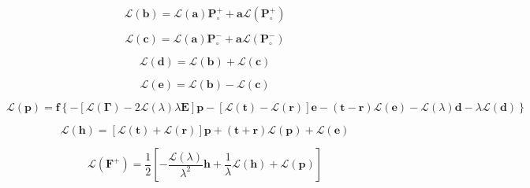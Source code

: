 \begin{equation}
\mathcal{L}(\mathbf{b}) = \mathcal{L}(\mathbf{a})\mathbf{P}^{+}_{\circ} + \mathbf{a}\mathcal{L}(\mathbf{P}^{+}_{\circ})
\label{eq:solar_source-local_solar_source-classical_reduced_order-tangent_linear-b_l}
\end{equation}

\begin{equation}
\mathcal{L}(\mathbf{c}) = \mathcal{L}(\mathbf{a})\mathbf{P}^{-}_{\circ} + \mathbf{a}\mathcal{L}(\mathbf{P}^{-}_{\circ})
\label{eq:solar_source-local_solar_source-classical_reduced_order-tangent_linear-c_l}
\end{equation}

\begin{equation}
\mathcal{L}(\mathbf{d}) = \mathcal{L}(\mathbf{b}) + \mathcal{L}(\mathbf{c})
\label{eq:solar_source-local_solar_source-classical_reduced_order-tangent_linear-d_l}
\end{equation}

\begin{equation}
\mathcal{L}(\mathbf{e}) = \mathcal{L}(\mathbf{b}) - \mathcal{L}(\mathbf{c})
\label{eq:solar_source-local_solar_source-classical_reduced_order-tangent_linear-e_l}
\end{equation}

\begin{equation}
\mathcal{L}(\mathbf{p}) = \mathbf{f}\left\{-\left[\mathcal{L}(\mathbf{\Gamma}) - 2 \mathcal{L}(\lambda)\lambda\mathbf{E}\right]\mathbf{p} - \left[\mathcal{L}(\mathbf{t}) - \mathcal{L}(\mathbf{r})\right]  \mathbf{e} - (\mathbf{t} - \mathbf{r})\mathcal{L}(\mathbf{e}) - \mathcal{L}(\lambda)\mathbf{d} - \lambda\mathcal{L}(\mathbf{d})\right\}
\label{eq:solar_source-local_solar_source-classical_reduced_order-tangent_linear-p_l}
\end{equation}

\begin{equation}
\mathcal{L}(\mathbf{h}) = \left[\mathcal{L}(\mathbf{t}) + \mathcal{L}(\mathbf{r})\right]\mathbf{p} + (\mathbf{t} + \mathbf{r})\mathcal{L}(\mathbf{p}) + \mathcal{L}(\mathbf{e})
\label{eq:solar_source-local_solar_source-classical_reduced_order-tangent_linear-h_l}
\end{equation}

\begin{equation}
\mathcal{L}(\mathbf{F}^{+}) = \frac{1}{2}\left[-\frac{\mathcal{L}(\lambda)}{\lambda^{2}}\mathbf{h} + \frac{1}{\lambda}\mathcal{L}(\mathbf{h}) + \mathcal{L}(\mathbf{p})\right]
\label{eq:solar_source-local_solar_source-classical_reduced_order-tangent_linear-G_p}
\end{equation}

